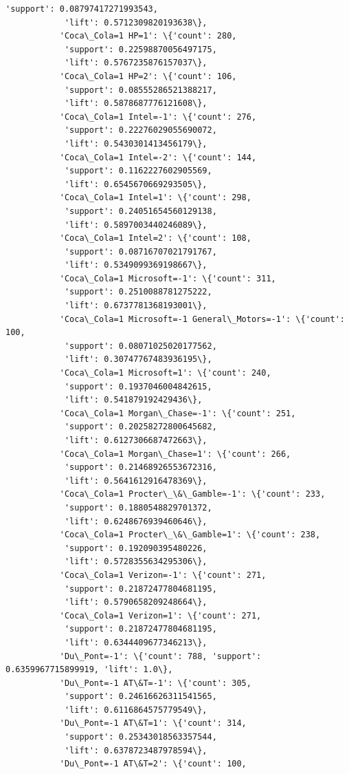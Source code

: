 \documentclass[11pt]{article}
\begin{document}
\begin{Verbatim}[commandchars=\\\{\}]
            'support': 0.08797417271993543,
            'lift': 0.5712309820193638\},
           'Coca\_Cola=1 HP=1': \{'count': 280,
            'support': 0.22598870056497175,
            'lift': 0.5767235876157037\},
           'Coca\_Cola=1 HP=2': \{'count': 106,
            'support': 0.08555286521388217,
            'lift': 0.5878687776121608\},
           'Coca\_Cola=1 Intel=-1': \{'count': 276,
            'support': 0.22276029055690072,
            'lift': 0.5430301413456179\},
           'Coca\_Cola=1 Intel=-2': \{'count': 144,
            'support': 0.1162227602905569,
            'lift': 0.6545670669293505\},
           'Coca\_Cola=1 Intel=1': \{'count': 298,
            'support': 0.24051654560129138,
            'lift': 0.5897003440246089\},
           'Coca\_Cola=1 Intel=2': \{'count': 108,
            'support': 0.08716707021791767,
            'lift': 0.5349099369198667\},
           'Coca\_Cola=1 Microsoft=-1': \{'count': 311,
            'support': 0.2510088781275222,
            'lift': 0.6737781368193001\},
           'Coca\_Cola=1 Microsoft=-1 General\_Motors=-1': \{'count': 100,
            'support': 0.08071025020177562,
            'lift': 0.30747767483936195\},
           'Coca\_Cola=1 Microsoft=1': \{'count': 240,
            'support': 0.1937046004842615,
            'lift': 0.541879192429436\},
           'Coca\_Cola=1 Morgan\_Chase=-1': \{'count': 251,
            'support': 0.20258272800645682,
            'lift': 0.6127306687472663\},
           'Coca\_Cola=1 Morgan\_Chase=1': \{'count': 266,
            'support': 0.21468926553672316,
            'lift': 0.5641612916478369\},
           'Coca\_Cola=1 Procter\_\&\_Gamble=-1': \{'count': 233,
            'support': 0.1880548829701372,
            'lift': 0.6248676939460646\},
           'Coca\_Cola=1 Procter\_\&\_Gamble=1': \{'count': 238,
            'support': 0.192090395480226,
            'lift': 0.5728355634295306\},
           'Coca\_Cola=1 Verizon=-1': \{'count': 271,
            'support': 0.21872477804681195,
            'lift': 0.5790658209248664\},
           'Coca\_Cola=1 Verizon=1': \{'count': 271,
            'support': 0.21872477804681195,
            'lift': 0.6344409677346213\},
           'Du\_Pont=-1': \{'count': 788, 'support': 0.6359967715899919, 'lift': 1.0\},
           'Du\_Pont=-1 AT\&T=-1': \{'count': 305,
            'support': 0.24616626311541565,
            'lift': 0.6116864575779549\},
           'Du\_Pont=-1 AT\&T=1': \{'count': 314,
            'support': 0.25343018563357544,
            'lift': 0.6378723487978594\},
           'Du\_Pont=-1 AT\&T=2': \{'count': 100,

\end{Verbatim}
\end{document}

